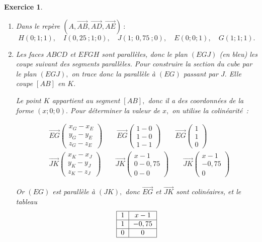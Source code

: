 \documentclass[10pt]{article}
\newtheorem{exo}{Exercice}
\begin{document}
\begin{exo}
\begin{multicols}{2}
\begin{enumerate}
\item Dans le repère $\left(A,\overrightarrow{AB},\overrightarrow{AD},\overrightarrow{AE}\right)~:$
\small
\[H(0;1;1),\quad I(0,25~;1;0),\quad J(1;~0,75~;0),\quad E(0;0;1),\quad G(1;1;1).\]
 \normalsize
\item Les faces $ABCD$ et $EFGH$ sont parallèles, donc le plan $(EGJ)$ (en bleu) les coupe suivant des segments parallèles. Pour construire la section du cube par le plan $(EGJ),$ on trace donc la parallèle à $(EG)$ passant par $J.$ Elle coupe $\left[AB\right]$ en $K.$

\medskip

Le point $K$ appartient au segment $\left[AB\right],$ donc il a des coordonnées de la forme $(x;0;0).$ Pour déterminer la valeur de $x,$ on utilise la colinéarité~:

\begin{align*}&\overrightarrow{EG}\begin{pmatrix} x_G-x_E\\y_G-y_E\\z_G-z_E\end{pmatrix}\qquad 
\overrightarrow{EG}\begin{pmatrix} 1-0\\1-0\\1-1\end{pmatrix}\qquad \overrightarrow{EG}\begin{pmatrix} 1
\\1\\0 \end{pmatrix}\\
&\overrightarrow{JK}\begin{pmatrix} x_K-x_J\\y_K-y_J\\z_K-z_J \end{pmatrix}\qquad 
\overrightarrow{JK}\begin{pmatrix} x-1\\0-0,75\\0-0\end{pmatrix}\qquad \overrightarrow{JK}\begin{pmatrix} x-1
\\-0,75\\0 \end{pmatrix}
\end{align*}

\medskip

Or $(EG)$ est parallèle à $(JK),$ donc $\overrightarrow{EG}$ et $\overrightarrow{JK} $ sont colinéaires, et le tableau \[\begin{tabular}{|c|c|}\hline
   $1$ & $x-1$  \\ \hline
  $1$ & $-0,75$  \\ \hline
   $0$ & $0$  \\ \hline
   \end{tabular}\]
   

\end{enumerate}
\end{multicols}
\end{exo}
\end{document}

